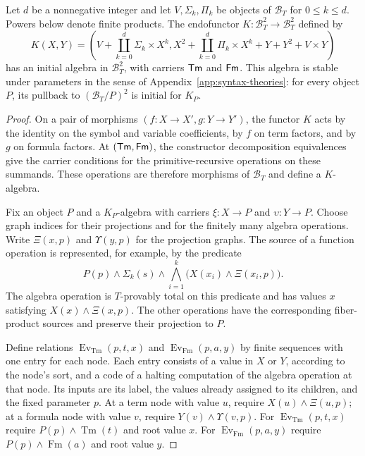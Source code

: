 \begin{proposition}
\label{prop:st-syntax-initiality}
Let $d$ be a nonnegative integer and let $V,\Sigma_k,\Pi_k$ be
objects of $\mathcal B_T$ for $0\leq k\leq d$. Powers below
denote finite products. The endofunctor
$K:\mathcal B_T^2\to\mathcal B_T^2$ defined by
\[
 K(X,Y)=\left(
 V+\coprod_{k=0}^{d}\Sigma_k\times X^k,
 X^2+\coprod_{k=0}^{d}\Pi_k\times X^k+Y+Y^2+V\times Y
 \right)
\]
has an initial algebra in $\mathcal B_T^2$, with carriers
$\mathsf{Tm}$ and $\mathsf{Fm}$. This algebra is stable
under parameters in the sense of Appendix~\ref{app:syntax-theories}: for every object $P$,
its pullback to $(\mathcal B_T/P)^2$ is initial for $K_P$.
\end{proposition}
\begin{proof}
On a pair of morphisms $(f:X\to X',g:Y\to Y')$, the functor $K$
acts by the identity on the symbol and variable coefficients, by $f$
on term factors, and by $g$ on formula factors. At $(\mathsf{Tm},\mathsf{Fm})$, the
constructor decomposition equivalences give the carrier conditions for
the primitive-recursive operations on these summands. These operations
are therefore morphisms of $\mathcal B_T$ and define a $K$-algebra.

Fix an object $P$ and a $K_P$-algebra with
carriers $\xi:X\to P$ and $\upsilon:Y\to P$. Choose graph indices for their projections and for the
finitely many algebra operations. Write
$\Xi(x,p)$ and $\Upsilon(y,p)$ for the projection graphs. The source of a function operation is represented, for example, by
the predicate
\[
       P(p)\land\Sigma_k(s)\land
       \bigwedge_{i=1}^k\bigl(X(x_i)\land\Xi(x_i,p)\bigr).
\]
The algebra operation
is $T$-provably total on this predicate and has values $x$ satisfying
$X(x)\land\Xi(x,p)$. The other operations have the corresponding
fiber-product sources and preserve their projection to $P$.

Define relations $\operatorname{Ev}_{\mathrm{Tm}}(p,t,x)$ and
$\operatorname{Ev}_{\mathrm{Fm}}(p,a,y)$ by finite sequences with
one entry for each node. Each entry consists of a value in $X$ or
$Y$, according to the node's sort, and a code of a halting computation
of the algebra operation at that node. Its inputs
are its label, the values already assigned to its children, and
the fixed parameter $p$. At a term node with value $u$, require
$X(u)\land\Xi(u,p)$; at a formula node with value $v$, require
$Y(v)\land\Upsilon(v,p)$. For $\operatorname{Ev}_{\mathrm{Tm}}(p,t,x)$
require $P(p)\land\operatorname{Tm}(t)$ and root value $x$.
For $\operatorname{Ev}_{\mathrm{Fm}}(p,a,y)$ require
$P(p)\land\operatorname{Fm}(a)$ and root value $y$.


\end{proof}
